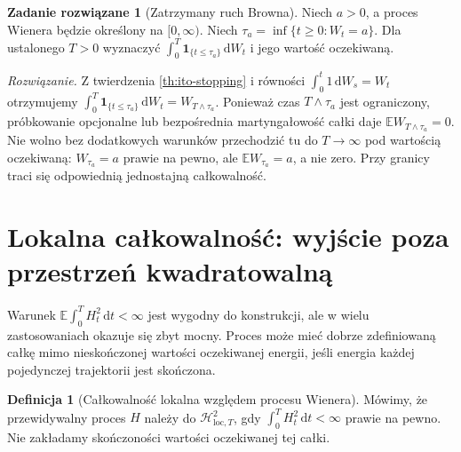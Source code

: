 \documentclass[11pt,a4paper,oneside]{report}
\numberwithin{equation}{chapter}
\theoremstyle{plain}
\theoremstyle{definition}
\newtheorem{definicja}{Definicja}[chapter]
\newtheorem{zadanie}{Zadanie rozwiązane}[chapter]
\theoremstyle{remark}
\newcommand{\E}{\mathbb{E}}
\newcommand{\calH}{\mathcal{H}}
\newcommand{\ind}[1]{\mathbf{1}_{#1}}
\newcommand{\dd}{\mathrm{d}}
\begin{document}
\begin{zadanie}[Zatrzymany ruch Browna]
Niech $a>0$, a proces Wienera będzie określony na
$[0,\infty)$. Niech $\tau_a=\inf\{t\ge0:W_t=a\}$.
Dla ustalonego $T>0$
wyznaczyć $\int_0^T\ind{\{t\le\tau_a\}}\,\dd W_t$
i jego wartość oczekiwaną.

\emph{Rozwiązanie.} Z twierdzenia \ref{th:ito-stopping}
i równości $\int_0^t1\,\dd W_s=W_t$ otrzymujemy
$\int_0^T\ind{\{t\le\tau_a\}}\,\dd W_t=W_{T\wedge\tau_a}$.
Ponieważ czas $T\wedge\tau_a$ jest ograniczony,
próbkowanie opcjonalne lub bezpośrednia martyngałowość
całki daje $\E W_{T\wedge\tau_a}=0$.
Nie wolno bez dodatkowych warunków przechodzić tu do
$T\to\infty$ pod wartością oczekiwaną:
$W_{\tau_a}=a$ prawie na pewno, ale $\E W_{\tau_a}=a$,
a nie zero. Przy granicy traci się odpowiednią
jednostajną całkowalność.
\end{zadanie}

\section{Lokalna całkowalność: wyjście poza przestrzeń kwadratowalną}
Warunek $\E\int_0^T H_t^2\,\dd t<\infty$ jest
wygodny do konstrukcji, ale w wielu zastosowaniach
okazuje się zbyt mocny. Proces może mieć dobrze
zdefiniowaną całkę mimo nieskończonej wartości oczekiwanej
energii, jeśli energia każdej pojedynczej trajektorii
jest skończona.

\begin{definicja}[Całkowalność lokalna względem procesu Wienera]
Mówimy, że przewidywalny proces $H$ należy do
$\calH_{\mathrm{loc},T}^2$, gdy
$\int_0^T H_t^2\,\dd t<\infty$ prawie na pewno.
Nie zakładamy skończoności wartości oczekiwanej tej całki.
\end{definicja}
\end{document}
